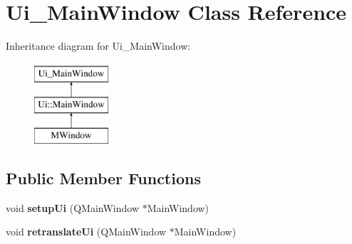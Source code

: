 \hypertarget{class_ui___main_window}{
\section{Ui\_\-MainWindow Class Reference}
\label{class_ui___main_window}
}
Inheritance diagram for Ui\_\-MainWindow:\begin{figure}[H]
\begin{center}
\leavevmode
\includegraphics[height=3.000000cm]{class_ui___main_window}
\end{center}
\end{figure}
\subsection*{Public Member Functions}
\begin{DoxyCompactItemize}
\item 
\hypertarget{class_ui___main_window_acf4a0872c4c77d8f43a2ec66ed849b58}{
void {\bfseries setupUi} (QMainWindow $\ast$MainWindow)}
\label{class_ui___main_window_acf4a0872c4c77d8f43a2ec66ed849b58}

\item 
\hypertarget{class_ui___main_window_a097dd160c3534a204904cb374412c618}{
void {\bfseries retranslateUi} (QMainWindow $\ast$MainWindow)}
\label{class_ui___main_window_a097dd160c3534a204904cb374412c618}

\end{DoxyCompactItemize}
